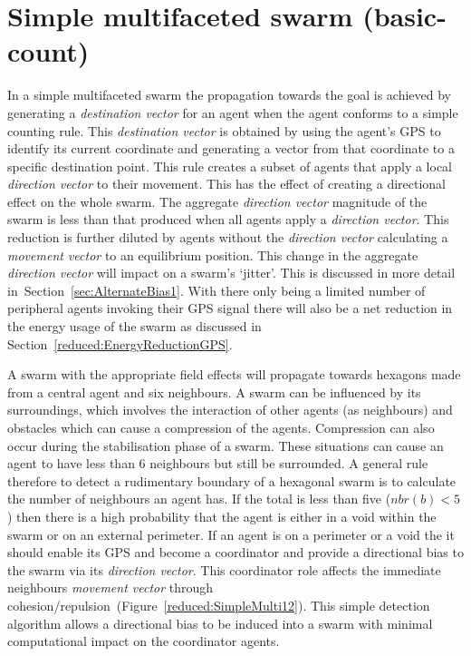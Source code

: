 \documentclass{ieeeaccess}
\begin{document}
\section{Simple multifaceted swarm (basic-count)}\label{sec:BasicCount} 
In a simple multifaceted swarm the propagation towards the goal is achieved by generating a \textit{destination vector} for an agent when the agent conforms to a simple counting rule. This \textit{destination vector} is obtained by using the agent's GPS to identify its current coordinate and generating a vector from that coordinate to a specific destination point. This rule creates a subset of agents that apply a local \textit{direction vector} to their movement. This has the effect of creating a directional effect on the whole swarm. The aggregate \textit{direction vector} magnitude of the swarm is less than that produced when all agents apply a \textit{direction vector}. This reduction is further diluted by agents without the \textit{direction vector} calculating a \textit{movement vector} to an equilibrium position. This change in the aggregate \textit{direction vector} will impact on a swarm's `jitter'. This is discussed in more detail in~Section~\ref{sec:AlternateBias1}. With there only being a limited number of peripheral agents invoking their GPS signal there will also be a net reduction in the energy usage of the swarm as discussed in Section~\ref{reduced:EnergyReductionGPS}.

A swarm with the appropriate field effects will propagate towards hexagons made from a central agent and six neighbours. A swarm can be influenced by its surroundings, which involves the interaction of other agents (as neighbours) and obstacles which can cause a compression of the agents. Compression can also occur during the stabilisation phase of a swarm. These situations can cause an agent to have less than 6 neighbours but still be surrounded. A general rule therefore to detect a rudimentary boundary of a hexagonal swarm is to calculate the number of neighbours an agent has. If the total is less than five ($nbr(b) < 5$) then there is a high probability that the agent is either in a void within the swarm or on an external perimeter. If an agent is on a perimeter or a void the it should enable its GPS and become a coordinator and provide a directional bias to the swarm via its \textit{direction vector}. This coordinator role affects the immediate neighbours \textit{movement vector} through cohesion/repulsion~(Figure~\ref{reduced:SimpleMulti12}). This simple detection algorithm allows a directional bias to be induced into a swarm with minimal computational impact on the coordinator agents.
\end{document}
